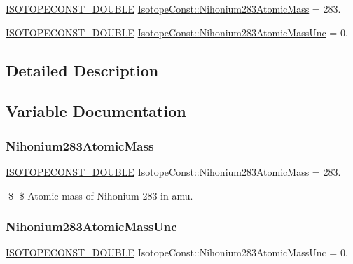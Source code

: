 \begin{DoxyCompactItemize}
\item 
\mbox{\hyperlink{group___isotope_const-_macros_ga8f45a7272ce02c0b4c65c44636ed719a}{I\+S\+O\+T\+O\+P\+E\+C\+O\+N\+S\+T\+\_\+\+D\+O\+U\+B\+LE}} \mbox{\hyperlink{group___isotope_const-_nihonium-_nh283_gaa4ec71c4777fbf49fc80148238bcca9d}{Isotope\+Const\+::\+Nihonium283\+Atomic\+Mass}} = 283.
\item 
\mbox{\hyperlink{group___isotope_const-_macros_ga8f45a7272ce02c0b4c65c44636ed719a}{I\+S\+O\+T\+O\+P\+E\+C\+O\+N\+S\+T\+\_\+\+D\+O\+U\+B\+LE}} \mbox{\hyperlink{group___isotope_const-_nihonium-_nh283_ga94da61afb102f8760c5320bbfa660476}{Isotope\+Const\+::\+Nihonium283\+Atomic\+Mass\+Unc}} = 0.
\end{DoxyCompactItemize}


\subsection{Detailed Description}


\subsection{Variable Documentation}
\mbox{\label{group___isotope_const-_nihonium-_nh283_gaa4ec71c4777fbf49fc80148238bcca9d}} 
\subsubsection{\texorpdfstring{Nihonium283\+Atomic\+Mass}{Nihonium283AtomicMass}}
{\footnotesize\ttfamily \mbox{\hyperlink{group___isotope_const-_macros_ga8f45a7272ce02c0b4c65c44636ed719a}{I\+S\+O\+T\+O\+P\+E\+C\+O\+N\+S\+T\+\_\+\+D\+O\+U\+B\+LE}} Isotope\+Const\+::\+Nihonium283\+Atomic\+Mass = 283.}

\$ \$ Atomic mass of Nihonium-\/283 in amu. \mbox{\label{group___isotope_const-_nihonium-_nh283_ga94da61afb102f8760c5320bbfa660476}} 
\subsubsection{\texorpdfstring{Nihonium283\+Atomic\+Mass\+Unc}{Nihonium283AtomicMassUnc}}
{\footnotesize\ttfamily \mbox{\hyperlink{group___isotope_const-_macros_ga8f45a7272ce02c0b4c65c44636ed719a}{I\+S\+O\+T\+O\+P\+E\+C\+O\+N\+S\+T\+\_\+\+D\+O\+U\+B\+LE}} Isotope\+Const\+::\+Nihonium283\+Atomic\+Mass\+Unc = 0.}


